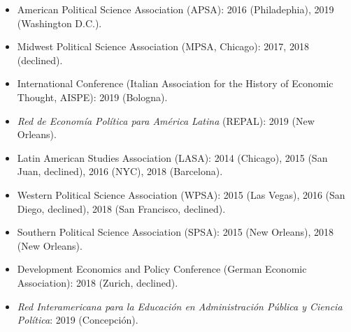 \begin{itemize}
\item American Political Science Association (APSA): 2016 (Philadephia), 2019 (Washington D.C.).
\item Midwest Political Science Association (MPSA, Chicago): 2017, 2018 (declined).
\item International Conference (Italian Association for the History of Economic Thought, AISPE): 2019 (Bologna).
\item \emph{Red de Econom\'ia Pol\'itica para Am\'erica Latina} (REPAL): 2019 (New Orleans).
\item Latin American Studies Association (LASA): 2014 (Chicago), 2015 (San Juan, declined), 2016 (NYC), 2018 (Barcelona).
\item Western Political Science Association (WPSA): 2015 (Las Vegas), 2016 (San Diego, declined), 2018 (San Francisco, declined).
\item Southern Political Science Association (SPSA): 2015 (New Orleans), 2018 (New Orleans).
\item Development Economics and Policy Conference (German Economic Association): 2018 (Zurich, declined).
\item \emph{Red Interamericana para la Educaci\'on en Administraci\'on P\'ublica y Ciencia Pol\'itica}: 2019 (Concepci\'on).
\end{itemize}
